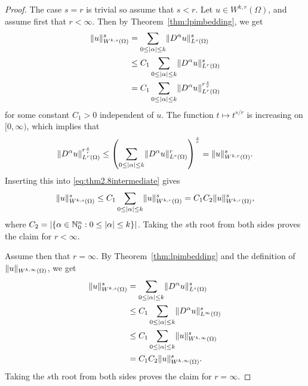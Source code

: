 \documentclass[english, 12pt, a4paper, sci, utf8, a-2b, online]{aaltothesis}
\theoremstyle{definition}
\theoremstyle{plain}
\DeclarePairedDelimiter\abs{\lvert}{\rvert}
\DeclarePairedDelimiter\norm{\lVert}{\rVert}
\numberwithin{equation}{section}
\begin{document}
\begin{proof}
    The case $s=r$ is trivial so assume that $s < r$.
    Let $u \in W^{k,r}(\Omega)$, and assume first that $r < \infty$.
    Then by Theorem~\ref{thm:lpimbedding}, we get
    \begin{align}
        \norm{u}_{W^{k,s}(\Omega)}^s
        &= \sum_{0 \leq \abs{\alpha} \leq k} \norm{D^{\alpha} u}_{L^s(\Omega)}^s
            \nonumber \\
        &\leq C_1 \sum_{0 \leq \abs{\alpha} \leq k}
            \norm{D^{\alpha} u}_{L^r(\Omega)}^s \nonumber \\
        \label{eq:thm2.8intermediate}
        &= C_1 \sum_{0 \leq \abs{\alpha} \leq k}
            \norm{D^{\alpha} u}_{L^r(\Omega)}^{r \frac{s}{r}}
    \end{align}
    for some constant $C_1 > 0$ independent of $u$.
    The function $t \mapsto t^{s/r}$ is increasing on $[0, \infty)$,
    which implies that
    \begin{equation*}
        \norm{D^{\alpha} u}_{L^r(\Omega)}^{r \frac{s}{r}}
        \leq \left( \sum_{0 \leq \abs{\alpha} \leq k}
            \norm{D^{\alpha} u}_{L^r(\Omega)}^{r}
                \right)^{\frac{s}{r}}
        = \norm{u}_{W^{k,r}(\Omega)}^s.
    \end{equation*}
    Inserting this into \eqref{eq:thm2.8intermediate} gives
    \begin{equation*}
        \norm{u}_{W^{k,s}(\Omega)}^s
        \leq C_1 \sum_{0 \leq \abs{\alpha} \leq k} \norm{u}_{W^{k,r}(\Omega)}^s
        = C_1 C_2 \norm{u}_{W^{k,r}(\Omega)}^s,
    \end{equation*}
    where
    $C_2 = \abs{\{ \alpha \in \mathbb{N}_0^n : 0 \leq \abs{\alpha} \leq k \}}$.
    Taking the $s$th root from both sides proves the claim for $r < \infty$.

    Assume then that $r = \infty$.
    By Theorem~\ref{thm:lpimbedding} and the definition of
    $\norm{u}_{W^{k,\infty}(\Omega)}$, we get
    \begin{align*}
        \norm{u}_{W^{k,s}(\Omega)}^s
        &= \sum_{0 \leq \abs{\alpha} \leq k} \norm{D^{\alpha} u}_{L^s(\Omega)}^s \\
        &\leq C_1 \sum_{0 \leq \abs{\alpha} \leq k}
            \norm{D^{\alpha} u}_{L^{\infty}(\Omega)}^s \\
        &\leq C_1 \sum_{0 \leq \abs{\alpha} \leq k}
            \norm{u}_{W^{k,\infty}(\Omega)}^s \\
        &= C_1 C_2 \norm{u}_{W^{k,\infty}(\Omega)}^s.
    \end{align*}
    Taking the $s$th root from both sides proves the claim for $r=\infty$.
\end{proof}
\end{document}
